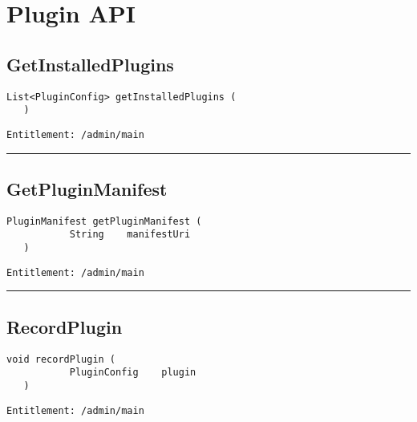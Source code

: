 \chapter{Plugin API}

\section{GetInstalledPlugins}
\label{Api:GetInstalledPlugins}
\begin{lstlisting}[style=nonumbers]
   List<PluginConfig> getInstalledPlugins (
   )
\end{lstlisting}
\begin{Verbatim}[formatcom=\color{Maroon}]
  Entitlement: /admin/main
\end{Verbatim}



\rule{12cm}{2pt}
\section{GetPluginManifest}
\label{Api:GetPluginManifest}
\begin{lstlisting}[style=nonumbers]
   PluginManifest getPluginManifest (
           String    manifestUri
   )
\end{lstlisting}
\begin{Verbatim}[formatcom=\color{Maroon}]
  Entitlement: /admin/main
\end{Verbatim}



\rule{12cm}{2pt}
\section{RecordPlugin}
\label{Api:RecordPlugin}
\begin{lstlisting}[style=nonumbers]
   void recordPlugin (
           PluginConfig    plugin
   )
\end{lstlisting}
\begin{Verbatim}[formatcom=\color{Maroon}]
  Entitlement: /admin/main
\end{Verbatim}



